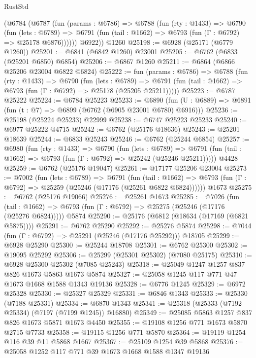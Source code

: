 \begin{lexlean}{RustStd}
\begin{coremodule}
      (@6784
        (@6787
          (fun (params : @6786) =>
          @6788
            (fun (rty : @1433) =>
            @6790
              (fun (lets : @6789) =>
              @6791 (fun (tail : @1662) => @6793 (fun (Γ : @6792) => @25178 @6876))))))
        @6922))
    @1260
@25198 := @6928 (@25171 (@6779 @1260))
@25201 := @6841 (@6842 @1260) @23001
@25205 := @6762 (@6833 (@25201 @6850) @6854)
@25206 := @6867 @1260
@25211 := @6864 (@6866 @25206 @23004 @6822 @6824)
@25222 := fun (params : @6786) =>
  @6788
    (fun (rty : @1433) =>
    @6790
      (fun (lets : @6789) =>
      @6791 (fun (tail : @1662) => @6793 (fun (Γ : @6792) => @25178 (@25205 @25211)))))
@25223 := @6787 @25222
@25224 := @6784 @25223
@25233 := @6890
    (fun (U : @6889) => @6891 (fun (t : @7) => @6899 (@6762 (@6905 @23001 @6780) @6916)))
@25236 := @25198 (@25224 @25233) @22999
@25238 := @6747 @25223 @25233
@25240 := @6977 @25222 @4715
@25242 := @6762 (@25176 @18636)
@25243 := @25201 @18639
@25244 := @6833 @25243
@25246 := @6762 (@25244 @6854)
@25257 := @6980
    (fun (rty : @1433) =>
    @6790
      (fun (lets : @6789) =>
      @6791 (fun (tail : @1662) => @6793 (fun (Γ : @6792) => @25242 (@25246 @25211)))))
    @4428
@25259 := @6762 (@25176 @19047)
@25261 := @17177 @25206 @23004
@25273 := @7002
    (fun (lets : @6789) =>
    @6791
      (fun (tail : @1662) =>
      @6793 (fun (Γ : @6792) => @25259 (@25246 (@17176 (@25261 @6822 @6824))))))
    @1673
@25275 := @6762 (@25176 @19066)
@25276 := @25261 @1673
@25285 := @7026
    (fun (tail : @1662) => @6793 (fun (Γ : @6792) => @25275 (@25246 (@17176 (@25276 @6824)))))
    @5874
@25290 := @25176 (@6812 (@18634 (@17169 (@6821 @5875))))
@25291 := @6762 @25290
@25292 := @25276 @5874
@25298 := @7044 (fun (Γ : @6792) => @25291 (@25246 (@17176 @25292))) @18705
@25299 := @6928 @25290
@25300 := @25244 @18708
@25301 := @6762 @25300
@25302 := @19095 @25292
@25306 := @25299 (@25301 @25302) (@7080 @25175)
@25310 := @6928 @25300 @25302 (@7085 @25243)
@25318 := @25049 @1247 @1257 @837 @826 @1673 @5863 @1673 @5874
@25327 := @25058 @1245 @117 @771 @47 @1673 @1668 @1588 @1343 @19136
@25328 := @6776 @1245
@25329 := @6972 @25328
@25330 := @25327 @25329
@25331 := @6846 @1343
@25333 := @25330 (@7188 @25331)
@25334 := @6870 @1343
@25341 := @25318 (@25333 (@7192 @25334) (@7197 (@7199 @1245)) @16880)
@25349 := @25085 @5863 @1257 @837 @826 @1673 @5871 @1673 @4450
@25355 := @19108 @1256 @771 @1673 @5870 @2715 @7733
@25358 := @19115 @1256 @771 @5870
@25364 := @19119 @1254 @116 @39 @11 @5868 @1667
@25367 := @25109 @1254 @39 @5868
@25376 := @25058 @1252 @117 @771 @39 @1673 @1668 @1588 @1347 @19136

\end{coremodule}
\end{lexlean}
